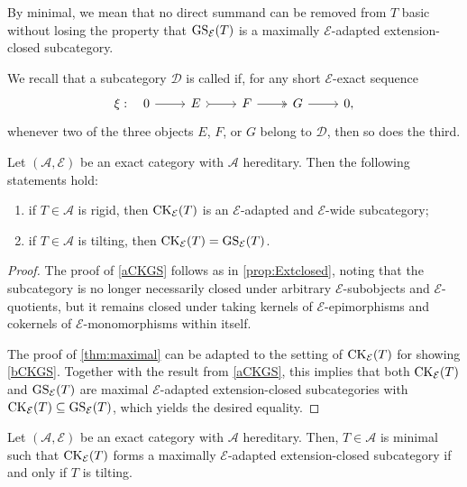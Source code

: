\begin{remark}
By minimal, we mean that no direct summand can be removed from $T$ basic without losing the property that $\operatorname{GS}_{\mathcal{E}}(T)$ is a maximally $\mathcal{E}$-adapted extension-closed subcategory.
\end{remark}

\begin{definition}
We recall that a subcategory $\mathscr{D}$ is called  if, for any short $\mathcal{E}$-exact sequence
\[
\begin{tikzcd}
	\xi:\quad 0 \arrow[r] & E \arrow[r, tail] & F \arrow[r, two heads] & G \arrow[r] & 0,
\end{tikzcd}
\]
whenever two of the three objects $E$, $F$, or $G$ belong to $\mathscr{D}$, then so does the third.
\end{definition}

\begin{prop}
Let $(\mathscr{A}, \mathcal{E})$ be an exact category with $\mathscr{A}$ hereditary. Then the following statements hold:
\begin{enumerate}[label=$(\alph*)$, itemsep=1mm]
    \item \label{aCKGS} if $T \in \mathscr{A}$ is rigid, then $\mathrm{CK}_{\mathcal{E}}(T)$ is an $\mathcal{E}$-adapted and $\mathcal{E}$-wide subcategory;
    \item \label{bCKGS} if $T \in \mathscr{A}$ is tilting, then $\mathrm{CK}_{\mathcal{E}}(T) = \operatorname{GS}_{\mathcal{E}}(T)$. 
\end{enumerate}
\end{prop}

\begin{proof}
The proof of \ref{aCKGS} follows as in \cref{prop:Extclosed}, noting that the subcategory is no longer necessarily closed under arbitrary $\mathcal{E}$-subobjects and $\mathcal{E}$-quotients, but it remains closed under taking kernels of $\mathcal{E}$-epimorphisms and cokernels of $\mathcal{E}$-monomorphisms within itself.

The proof of \cref{thm:maximal} can be adapted to the setting of $\mathrm{CK}_{\mathcal{E}}(T)$ for showing \ref{bCKGS}. Together with the result from \ref{aCKGS}, this implies that both $\mathrm{CK}_{\mathcal{E}}(T)$ and $\operatorname{GS}_{\mathcal{E}}(T)$  are maximal $\mathcal{E}$-adapted extension-closed subcategories with $\mathrm{CK}_{\mathcal{E}}(T) \subseteq \operatorname{GS}_{\mathcal{E}}(T)$, which yields the desired equality.
\end{proof}

\begin{conj} \label{conj:TiltasmingenCK}
Let $(\mathscr{A},\mathcal{E})$ be an exact category with $\mathscr{A}$ hereditary. Then, $T \in \mathscr{A}$ is minimal such that $\mathrm{CK}_{\mathcal{E}}(T)$ forms a maximally $\mathcal{E}$-adapted extension-closed subcategory if and only if $T$ is tilting.  
\end{conj}

